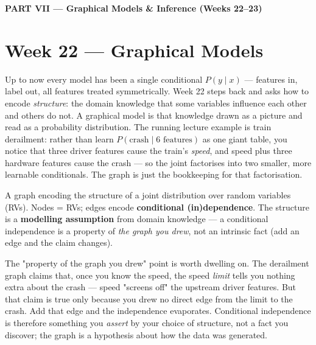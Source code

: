 \documentclass[11pt, a4paper]{article}
\newcommand{\kw}[1]{\textbf{#1}}
\begin{document}
\begin{center}\large\bfseries\color{defBd} PART VII — Graphical Models \& Inference (Weeks 22–23)\end{center}

\section{Week 22 — Graphical Models}

Up to now every model has been a single conditional $P(y\mid x)$ — features in, label out, all
features treated symmetrically. Week 22 steps back and asks how to encode \emph{structure}: the
domain knowledge that some variables influence each other and others do not. A graphical model is
that knowledge drawn as a picture and read as a probability distribution. The running lecture
example is train derailment: rather than learn $P(\text{crash}\mid 6\text{ features})$ as one giant
table, you notice that three driver features cause the train's \emph{speed}, and speed plus three
hardware features cause the crash — so the joint factorises into two smaller, more learnable
conditionals. The graph is just the bookkeeping for that factorisation.

\begin{setupbox}
A graph encoding the structure of a joint distribution over random variables (RVs). Nodes = RVs;
edges encode \kw{conditional (in)dependence}. The structure is a \kw{modelling assumption} from
domain knowledge — a conditional independence is a property of \emph{the graph you drew}, not an
intrinsic fact (add an edge and the claim changes).
\end{setupbox}

The "property of the graph you drew" point is worth dwelling on. The derailment graph claims that,
once you know the speed, the speed \emph{limit} tells you nothing extra about the crash — speed
"screens off" the upstream driver features. But that claim is true only because you drew no direct
edge from the limit to the crash. Add that edge and the independence evaporates. Conditional
independence is therefore something you \emph{assert} by your choice of structure, not a fact you
discover; the graph is a hypothesis about how the data was generated.
\end{document}
